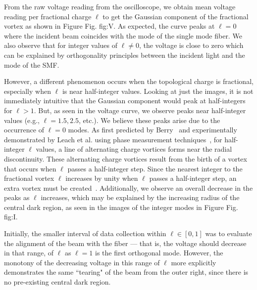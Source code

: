 \documentclass[10pt,a4paper,twoside]{article}
\renewcommand{\l}{\ell}
\renewcommand{\ref}[1]{Fig. #1}
\begin{document}
From the raw voltage reading from the oscilloscope, we obtain mean voltage reading per fractional charge $\l$ to get the Gaussian component of the fractional vortex as shown in Figure \ref{fig:V}. As expected, the curve peaks at $\l = 0$ where the incident beam coincides with the mode of the single mode fiber. We also observe that for integer values of $\l \neq 0$, the voltage is close to zero which can be explained by orthogonality principles between the incident light and the mode of the SMF. %

However, a different phenomenon occurs when the topological charge is fractional, especially when $\l$ is near half-integer values. Looking at just the images, it is not immediately intuitive that the Gaussian component would peak at half-integers for $\l > 1$. But, as seen in the voltage curve, we observe peaks near half-integer values (e.g., $\l = 1.5, 2.5$, etc.). We believe these peaks arise due to the occurrence of $\l = 0$ modes. As first predicted by Berry~\cite{Berry} and experimentally demonstrated by Leach et al. using phase measurement techniques~\cite{exp-struc}, for half-integer $\l$ values, a line of alternating charge vortices forms near the radial discontinuity. These alternating charge vortices result from the birth of a vortex that occurs when $\l$ passes a half-integer step. Since the nearest integer to the fractional vortex $\l$ increases by unity when $\l$ passes a half-integer step, an extra vortex must be created~\cite{Berry}. Additionally, we observe an overall decrease in the peaks as $\l$ increases, which may be explained by the increasing radius of the central dark region, as seen in the images of the integer modes in Figure \ref{fig:I}.

Initially, the smaller interval of data collection within $\l \in [0, 1]$ was to evaluate the alignment of the beam with the fiber --- that is, the voltage should decrease in that range, of $\l$ as $\l=1$ is the first orthogonal mode. However, the monotony of the decreasing voltage in this range of $\l$ more explicitly demonstrates the same ``tearing" of the beam from the outer right, since there is no pre-existing central dark region.
\end{document}
